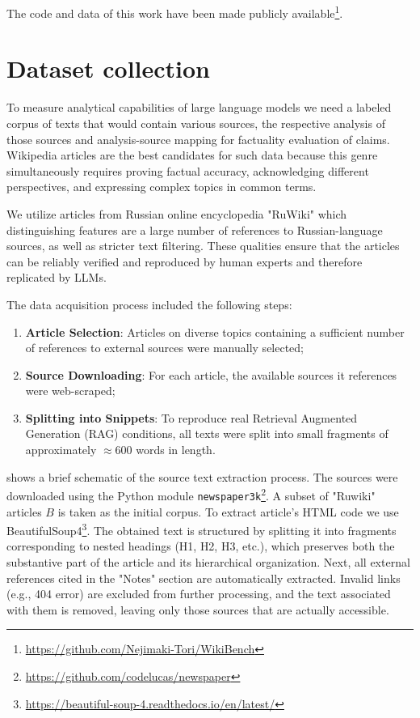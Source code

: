 \documentclass{superfri}
\begin{document}
The code and data of this work have been made publicly available\footnote{\url{https://github.com/Nejimaki-Tori/WikiBench}}.

\section{Dataset collection}
To measure analytical capabilities of large language models we need a labeled corpus of texts that would contain various sources, 
the respective analysis of those sources and analysis-source mapping for factuality evaluation of claims. 
Wikipedia articles are the best candidates for such data because this genre simultaneously requires proving factual accuracy, acknowledging different perspectives, 
and expressing complex topics in common terms.

We utilize articles from Russian online encyclopedia "RuWiki" which distinguishing features are a large number of references to Russian-language sources, 
as well as stricter text filtering. These qualities ensure that the articles can be reliably verified and reproduced by human experts and therefore replicated by LLMs.

The data acquisition process included the following steps:
\begin{enumerate}
\item \textbf{Article Selection}: Articles on diverse topics containing a sufficient number of references to external sources were manually selected;
\item \textbf{Source Downloading}: For each article, the available sources it references were web-scraped;
\item \parbox[t]{0.9\textwidth}{\textbf{Splitting into Snippets}: To reproduce real Retrieval Augmented Generation (RAG) conditions, all texts were split into small fragments of approximately $\approx 600$ words in length.}
\end{enumerate}



 shows a brief schematic of the source text extraction process. The sources were downloaded using the Python module \texttt{newspaper3k}\footnote{\url{https://github.com/codelucas/newspaper}}.
A subset of "Ruwiki" articles \(B\) is taken as the initial corpus.
To extract article's HTML code we use BeautifulSoup4\footnote{\url{https://beautiful-soup-4.readthedocs.io/en/latest/}}.
The obtained text is structured by splitting it into fragments corresponding to nested headings (H1, H2, H3, etc.), which preserves both the substantive part of the article and its hierarchical organization.
Next, all external references cited in the "Notes" section are automatically extracted. Invalid links (e.g., 404 error) are excluded from further processing,
and the text associated with them is removed, leaving only those sources that are actually accessible.
\end{document}
